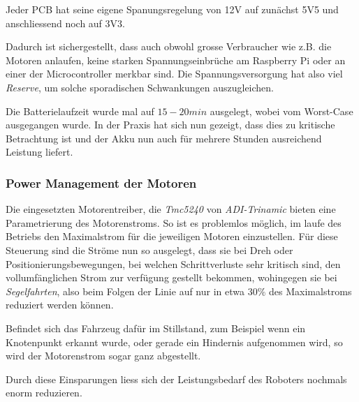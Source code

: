 \documentclass[main.tex]{subfiles} %
\begin{document}
Jeder PCB hat seine eigene Spanungsregelung von 12V auf zunächst 5V5 und
anschliessend noch auf 3V3.


Dadurch ist sichergestellt, dass auch obwohl grosse Verbraucher wie z.B. die
Motoren anlaufen, keine starken Spannungseinbrüche am Raspberry Pi oder an
einer der Microcontroller merkbar sind. Die Spannungsversorgung hat also viel
\textit{Reserve}, um solche sporadischen Schwankungen auszugleichen.

Die Batterielaufzeit wurde mal auf $15 - 20 min$ ausgelegt, wobei vom
Worst-Case ausgegangen wurde. In der Praxis hat sich nun gezeigt, dass dies zu
kritische Betrachtung ist und der Akku nun auch für mehrere Stunden ausreichend
Leistung liefert.

\subsubsection*{Power Management der Motoren}

Die eingesetzten Motorentreiber, die \textit{Tmc5240} von \textit{ADI-Trinamic}
bieten eine Parametrierung des Motorenstroms. So ist es problemlos möglich, im
laufe des Betriebs den Maximalstrom für die jeweiligen Motoren einzustellen.
Für diese Steuerung sind die Ströme nun so ausgelegt, dass sie bei Dreh oder
Positionierungsbewegungen, bei welchen Schrittverluste sehr kritisch sind, den
vollumfänglichen Strom zur verfügung gestellt bekommen, wohingegen sie bei
\textit{Segelfahrten}, also beim Folgen der Linie auf nur in etwa $30\%$ des
Maximalstroms reduziert werden können.

Befindet sich das Fahrzeug dafür im Stillstand, zum Beispiel wenn ein
Knotenpunkt erkannt wurde, oder gerade ein Hindernis aufgenommen wird, so wird
der Motorenstrom sogar ganz abgestellt.

Durch diese Einsparungen liess sich der Leistungsbedarf des Roboters nochmals
enorm reduzieren.
\end{document}
